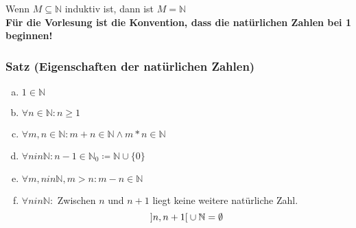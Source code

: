 \documentclass{article}
\begin{document}
Wenn $M \subseteq \mathbb{N}$ induktiv ist, dann ist $M = \mathbb{N}$ \\

\noindent
\textbf{Für die Vorlesung ist die Konvention, dass die natürlichen Zahlen bei 1 beginnen!}

\subsubsection{Satz (Eigenschaften der natürlichen Zahlen)}



\begin{enumerate}[(a)]
\item $1 \in \mathbb{N}$
\item \label{sec:1.4.4_b} $\forall n \in \mathbb{N} \colon n \geq 1$
\item $\forall m, n \in \mathbb{N} \colon m + n \in \mathbb{N} \land m * n \in \mathbb{N}$
\item $\forall n in \mathbb{N} \colon n - 1 \in \mathbb{N}_0 \coloneqq \mathbb{N} \cup \{ 0 \}$
\item $\forall m, n in \mathbb{N}, m > n \colon m - n \in \mathbb{N}$
\item \label{sec:1.4.4_f} $\forall n in \mathbb{N} \colon$ Zwischen $n$ und $n + 1$ liegt keine weitere natürliche Zahl.
  \[
    \interval[open]{n}{n + 1} \cup \mathbb{N} = \emptyset
  \]
\end{enumerate}
\end{document}
